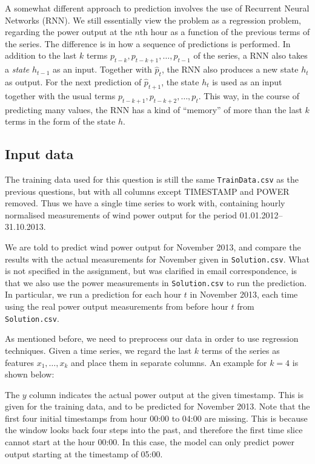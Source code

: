 \documentclass[11pt]{article}
\begin{document}
A somewhat different approach to prediction involves the use of Recurrent Neural Networks (RNN).
We still essentially view the problem as a regression problem, regarding the power output at the $n$th hour as a function of the previous terms of the series.
The difference is in how a sequence of predictions is performed.
In addition to the last $k$ terms $p_{t-k}, p_{t-k+1}, \dots, p_{t-1}$  of the series, a RNN also takes a \emph{state} $h_{t-1}$ as an input.
Together with $\hat{p}_t$, the RNN also produces a new state $h_t$ as output.
For the next prediction of $\hat{p}_{t+1}$, the state $h_t$ is used as an input together with the usual terms $p_{t-k+1}, p_{t-k+2}, \dots, p_t$.
This way, in the course of predicting many values, the RNN has a kind of ``memory'' of more than the last $k$ terms in the form of the state $h$.


\subsection*{Input data}
The training data used for this question is still the same \texttt{TrainData.csv} as the previous questions, but with all columns except TIMESTAMP and POWER removed.
Thus we have a single time series to work with, containing hourly normalised measurements of wind power output for the period 01.01.2012--31.10.2013.

We are told to predict wind power output for November 2013, and compare the results with the actual measurements for November given in \texttt{Solution.csv}.
What is not specified in the assignment, but was clarified in email correspondence, is that we also use the power measurements in \texttt{Solution.csv} to run the prediction.
In particular, we run a prediction for each hour $t$ in November 2013, each time using the real power output measurements from before hour $t$ from \texttt{Solution.csv}.

As mentioned before, we need to preprocess our data in order to use regression techniques.
Given a time series, we regard the last $k$ terms of the series as features $x_1, \dots, x_k$ and place them in separate columns.
An example for $k = 4$ is shown below:
\begin{center}
\end{center}

The $y$ column indicates the actual power output at the given timestamp.
This is given for the training data, and to be predicted for November 2013.
Note that the first four initial timestamps from hour 00:00 to 04:00 are missing.
This is because the window looks back four steps into the past, and therefore the first time slice cannot start at the hour 00:00.
In this case, the model can only predict power output  starting at the timestamp of 05:00.
\end{document}
